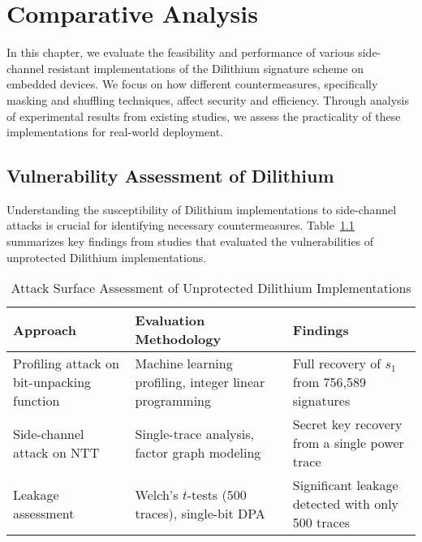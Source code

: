 \chapter{Comparative Analysis}
\thispagestyle{chapterstart}

In this chapter, we evaluate the feasibility and performance of various side-channel resistant implementations of the Dilithium signature scheme on embedded devices. We focus on how different countermeasures, specifically masking and shuffling techniques, affect security and efficiency. Through analysis of experimental results from existing studies, we assess the practicality of these implementations for real-world deployment.

\section{Vulnerability Assessment of Dilithium}

Understanding the susceptibility of Dilithium implementations to side-channel attacks is crucial for identifying necessary countermeasures. Table~\ref{tab:attack_surface} summarizes key findings from studies that evaluated the vulnerabilities of unprotected Dilithium implementations.

\begin{table}[ht]
    \centering
    \renewcommand{\arraystretch}{1.2}
    \caption{Attack Surface Assessment of Unprotected Dilithium Implementations}
    \label{tab:attack_surface}
    \begin{tabularx}{\textwidth}{|X|X|X|}
        \hline
        \textbf{Approach}                                             & \textbf{Evaluation Methodology}                        & \textbf{Findings}                                 \\ \hline
        Profiling attack on bit-unpacking function \cite{Marzougui22} & Machine learning profiling, integer linear programming & Full recovery of $s_1$ from 756,589 signatures    \\ \hline
        Side-channel attack on NTT \cite{Pessl19}                     & Single-trace analysis, factor graph modeling           & Secret key recovery from a single power trace     \\ \hline
        Leakage assessment \cite{Migliore19}                          & Welch's $t$-tests (500 traces), single-bit DPA         & Significant leakage detected with only 500 traces \\ \hline
    \end{tabularx}
\end{table}


